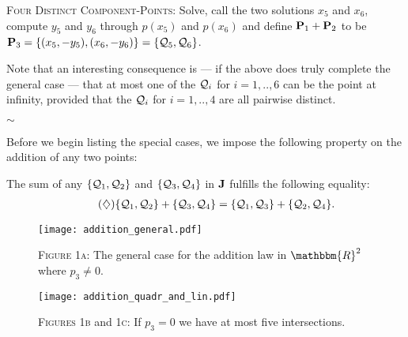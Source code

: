 \documentclass[english,11pt,a4paper]{article}
\begin{document}
\begin{case} {\scshape Four Distinct Component-Points:}
	Solve, call the two solutions $x_5$ and $x_6$, compute $y_5$ and $y_6$ through $p(x_5)$ and $p(x_6)$ and define $\P_1+\P_2$ to be $\P_3=\{ (x_5,-y_5) , (x_6,-y_6) \}=\{ \q_5, \q_6 \}$.

\begin{remark}
	Note that an interesting consequence is --- if the above does truly complete the general case --- that at most one of the $\q_i$ for $i=1, .. , 6$ can be the point at infinity, provided that the $\q_i$ for $i=1, .. , 4$ are all pairwise distinct.
\end{remark}
\end{case}
\vspace{-5mm}
\begin{center}
$\sim$
\end{center}

Before we begin listing the special cases, we impose the following property on the addition of any two points:

The sum of any $\{\q_1,\q_2\}$ and $\{\q_3,\q_4\}$ in $\J$ fulfills the following equality:
\begin{align*}
	\tag{$\diamondsuit$} \label{switch} \{\q_1,\q_2\} + \{\q_3,\q_4\} = \{\q_1,\q_3\} + \{\q_2,\q_4\}.
\end{align*}

\newpage
\begin{figure}[ht]
	\fline
	\begin{center}
		\vspace{1mm}
		\texttt{[image: addition\_general.pdf]}

		{\scshape Figure 1a}: The general case for the addition law in $\mathbbm{R}^2$ where $p_3 \neq 0$.

		\vspace{1mm}

		\texttt{[image: addition\_quadr\_and\_lin.pdf]}

		{\scshape Figures 1b} and {\scshape 1c}: If $p_3 = 0$ we have at most five intersections.
	\end{center}
	\vspace{-1.5mm}
	\fline
\end{figure}
\end{document}
